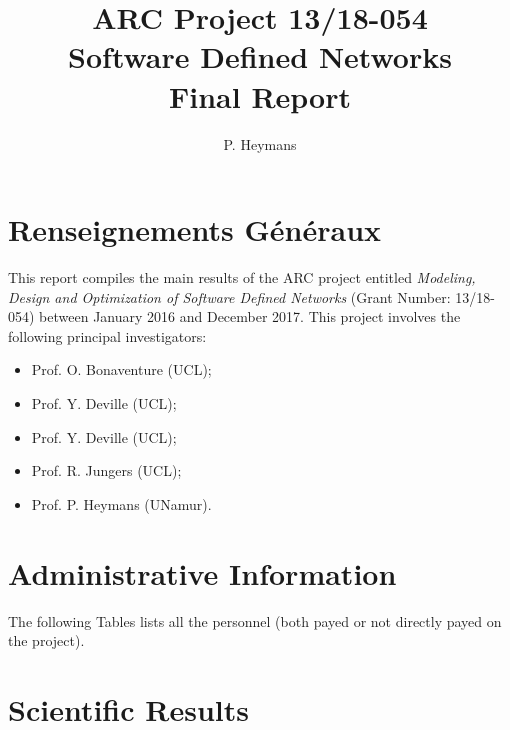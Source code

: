 \documentclass[a4paper]{article}
\title{\textbf{ARC Project 13/18-054}\\ 
   \textbf{Software Defined Networks}\\
   Final Report
}
\date{}
\author{P. Heymans}
\begin{document}
\maketitle

\section{Renseignements Généraux}

This report compiles the main results of the ARC project entitled 
\emph{Modeling, Design and Optimization of Software Defined Networks} 
(Grant Number: 13/18-054) between January 2016 and December 2017. 
This project involves the following principal investigators: 
\begin{itemize}
   \item Prof. O. Bonaventure (UCL);
   \item Prof. Y. Deville (UCL);
   \item Prof. Y. Deville (UCL);
   \item Prof. R. Jungers (UCL);
   \item Prof. P. Heymans (UNamur).
\end{itemize}

\section{Administrative Information}

The following Tables lists all the personnel (both payed or not directly payed 
on the project).

%

\newpage
\section{Scientific Results}

\end{document}
